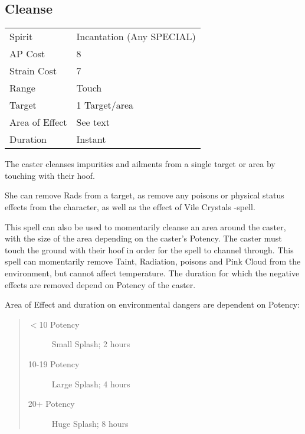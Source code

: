 \documentclass[11pt,a4paper,twocolumn]{book}
\begin{document}
\subsection*{Cleanse}
{
	\begin{tabu} to 75mm{| X[l,4] | X[l,7] |}
		\hline
		Spirit         & Incantation (Any SPECIAL) \\
		AP Cost        & 8                         \\
		Strain Cost    & 7                         \\
		Range          & Touch                     \\
		Target         & 1 Target/area             \\
		Area of Effect & See text                  \\
		Duration       & Instant                   \\ \hline
	\end{tabu}
	
}

\medskip

The caster cleanses impurities and ailments from a single target or area by touching with their hoof. 

She can remove Rads from a target, as remove any poisons or physical status effects from the character, as well as the effect of Vile Crystals -spell. 

This spell can also be used to momentarily cleanse an area around the caster, with the size of the area depending on the caster's Potency. The caster must touch the ground with their hoof in order for the spell to channel through. 
This spell can momentarily remove Taint, Radiation, poisons and Pink Cloud from the environment, but cannot affect temperature. The duration for which the negative effects are removed depend on Potency of the caster.

Area of Effect and duration on environmental dangers are dependent on Potency:

\begin{quote}
	\begin{description}
		\item[$<$10 Potency] 	Small Splash; 2 hours
		\item[10-19 Potency] 	Large Splash; 4 hours
		\item[20+ Potency]  	Huge Splash; 8 hours
	\end{description}	
\end{quote}
\end{document}
